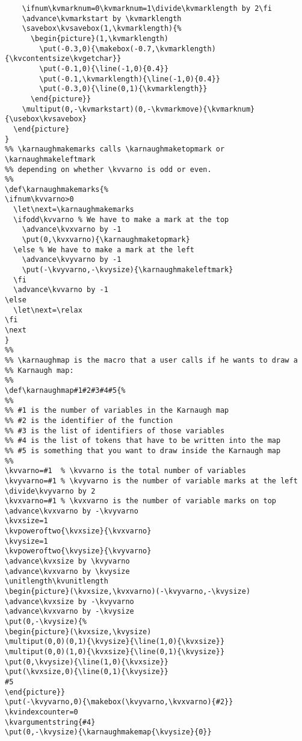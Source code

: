 \documentclass{article}
\begin{document}
\begin{verbatim}
    \ifnum\kvmarknum=0\kvmarknum=1\divide\kvmarklength by 2\fi 
    \advance\kvmarkstart by \kvmarklength
    \savebox\kvsavebox(1,\kvmarklength){%
      \begin{picture}(1,\kvmarklength)
        \put(-0.3,0){\makebox(-0.7,\kvmarklength){\kvcontentsize\kvgetchar}}
        \put(-0.1,0){\line(-1,0){0.4}}
        \put(-0.1,\kvmarklength){\line(-1,0){0.4}}
        \put(-0.3,0){\line(0,1){\kvmarklength}}
      \end{picture}}
    \multiput(0,-\kvmarkstart)(0,-\kvmarkmove){\kvmarknum}{\usebox\kvsavebox}
  \end{picture}
}
%% \karnaughmakemarks calls \karnaughmaketopmark or \karnaughmakeleftmark
%% depending on whether \kvvarno is odd or even.
%%
\def\karnaughmakemarks{%
\ifnum\kvvarno>0
  \let\next=\karnaughmakemarks
  \ifodd\kvvarno % We have to make a mark at the top
    \advance\kvxvarno by -1
    \put(0,\kvxvarno){\karnaughmaketopmark}
  \else % We have to make a mark at the left
    \advance\kvyvarno by -1
    \put(-\kvyvarno,-\kvysize){\karnaughmakeleftmark}
  \fi
  \advance\kvvarno by -1
\else
  \let\next=\relax
\fi
\next
}
%%
%% \karnaughmap is the macro that a user calls if he wants to draw a
%% Karnaugh map:  
%%
\def\karnaughmap#1#2#3#4#5{%
%%
%% #1 is the number of variables in the Karnaugh map
%% #2 is the identifier of the function
%% #3 is the list of identifiers of those variables 
%% #4 is the list of tokens that have to be written into the map
%% #5 is something that you want to draw inside the Karnaugh map
%%
\kvvarno=#1  % \kvvarno is the total number of variables 
\kvyvarno=#1 % \kvyvarno is the number of variable marks at the left 
\divide\kvyvarno by 2
\kvxvarno=#1 % \kvxvarno is the number of variable marks on top 
\advance\kvxvarno by -\kvyvarno
\kvxsize=1
\kvpoweroftwo{\kvxsize}{\kvxvarno}
\kvysize=1
\kvpoweroftwo{\kvysize}{\kvyvarno}
\advance\kvxsize by \kvyvarno
\advance\kvxvarno by \kvysize
\unitlength\kvunitlength
\begin{picture}(\kvxsize,\kvxvarno)(-\kvyvarno,-\kvysize)
\advance\kvxsize by -\kvyvarno
\advance\kvxvarno by -\kvysize
\put(0,-\kvysize){%
\begin{picture}(\kvxsize,\kvysize)
\multiput(0,0)(0,1){\kvysize}{\line(1,0){\kvxsize}}
\multiput(0,0)(1,0){\kvxsize}{\line(0,1){\kvysize}}
\put(0,\kvysize){\line(1,0){\kvxsize}}
\put(\kvxsize,0){\line(0,1){\kvysize}}
#5
\end{picture}}
\put(-\kvyvarno,0){\makebox(\kvyvarno,\kvxvarno){#2}}
\kvindexcounter=0
\kvargumentstring{#4}
\put(0,-\kvysize){\karnaughmakemap{\kvysize}{0}}

\end{verbatim}
\end{document}
